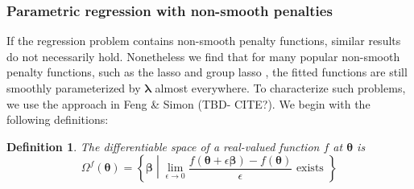 \documentclass[12pt]{article}
\newtheorem{definition}{Definition}
\begin{document}
%	
%	
%	
%	
%	

\subsubsection{Parametric regression with non-smooth penalties}

If the regression problem contains non-smooth penalty functions, similar results do not necessarily hold. Nonetheless we find that for many popular non-smooth penalty functions, such as the lasso \citep{tibshirani1996regression} and group lasso \citep{yuan2006model}, the fitted functions are still smoothly parameterized by $\boldsymbol \lambda$ almost everywhere. To characterize such problems, we use the approach in Feng \& Simon (TBD- CITE?). We begin with the following definitions:

\begin{definition}
	The differentiable space of a real-valued function $f$ at $\boldsymbol{\theta}$ is
	\begin{equation}
	\Omega^{f}(\boldsymbol{\theta}) = \left \{ \boldsymbol{\beta} \middle | \lim_{\epsilon \rightarrow 0} \frac{f(\boldsymbol{\theta} + \epsilon \boldsymbol{\beta}) - f(\boldsymbol{\theta})}{\epsilon} \text{ exists } \right \}
	\end{equation}
\end{definition}
\end{document}
